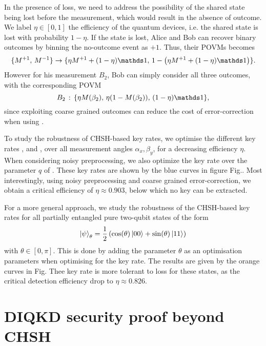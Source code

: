 In the presence of loss, we need to address the possibility of the shared state being lost before the measurement, which would result in the absence of outcome.
We label $\eta\in[0,1]$ the efficiency of the quantum devices, i.e. the shared state is lost with probability $1-\eta$.
If the state is lost, Alice and Bob can recover binary outcomes by binning the no-outcome event as $+1$.
Thus, their POVMs becomes
\begin{equation}
	\{M^{+1},\,M^{-1}\} \rightarrow \{\eta M^{+1}+(1-\eta) \id,\, 1-\left(\eta M^{+1}+(1-\eta) \id\right)\}.
\end{equation}
However for his measurement $B_2$, Bob can simply consider all three outcomes, with the corresponding POVM
\begin{equation}
	B_2\, : \, \{\eta M(\beta_2),\, \eta (1-M(\beta_2)),\, (1-\eta) \id \},
\end{equation}
since exploiting coarse grained outcomes can reduce the cost of error-correction when using .

To study the robustness of CHSH-based key rates, we optimise the different key rates ,  and , over all measurement angles $\alpha_x,\beta_y$, for a decreasing efficiency $\eta$. 
When considering noisy preprocessing, we also optimize the key rate over the parameter $q$ of .
These key rates are shown by the blue curves in figure Fig.. 
Most interestingly, using noisy preprocessing and coarse grained error-correction, we obtain a critical efficiency of $\eta \approx 0.903$, below which no key can be extracted.

For a more general approach, we study the robustness of the CHSH-based key rates for all partially entangled pure two-qubit states of the form
\begin{equation}
	\ket{\psi}_\theta = \frac{1}{2}\left(\cos(\theta)\ket{00}+\sin(\theta)\ket{11}\right)
\end{equation}
with $\theta\in[0,\pi]$.
This is done by adding the parameter $\theta$ as an optimisation parameters when optimising for the key rate.
The results are given by the orange curves in Fig.
Thee key rate is more tolerant to loss for these states, as the critical detection efficiency drop to $\eta\approx 0.826$.

\section{DIQKD security proof beyond CHSH}


